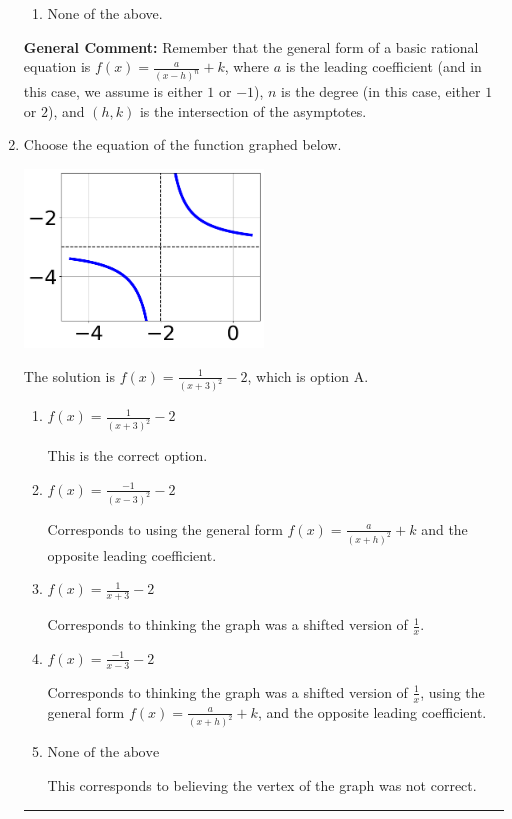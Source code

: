 \documentclass{extbook}[14pt]
\newcommand{\litem}[1]{\item #1

\rule{\textwidth}{0.4pt}}
\begin{document}
\begin{enumerate}
{\begin{enumerate}[label=\Alph*.]
\begin{multicols}{2}
\end{multicols}\item None of the above.\end{enumerate}
\textbf{General Comment:} Remember that the general form of a basic rational equation is $ f(x) = \frac{a}{(x-h)^n} + k$, where $a$ is the leading coefficient (and in this case, we assume is either $1$ or $-1$), $n$ is the degree (in this case, either $1$ or $2$), and $(h, k)$ is the intersection of the asymptotes.
}
\litem{
Choose the equation of the function graphed below.

\begin{center}
    \includegraphics[width=0.5\textwidth]{../Figures/rationalGraphToEquationCopyA.png}
\end{center}


The solution is \( f(x) = \frac{1}{(x + 3)^2} - 2 \), which is option A.\begin{enumerate}[label=\Alph*.]
\item \( f(x) = \frac{1}{(x + 3)^2} - 2 \)

This is the correct option.
\item \( f(x) = \frac{-1}{(x - 3)^2} - 2 \)

Corresponds to using the general form $f(x) = \frac{a}{(x+h)^2}+k$ and the opposite leading coefficient.
\item \( f(x) = \frac{1}{x + 3} - 2 \)

Corresponds to thinking the graph was a shifted version of $\frac{1}{x}$.
\item \( f(x) = \frac{-1}{x - 3} - 2 \)

Corresponds to thinking the graph was a shifted version of $\frac{1}{x}$, using the general form $f(x) = \frac{a}{(x+h)^2}+k$, and the opposite leading coefficient.
\item \( \text{None of the above} \)

This corresponds to believing the vertex of the graph was not correct.
\end{enumerate}

}
\end{enumerate}
\end{document}
